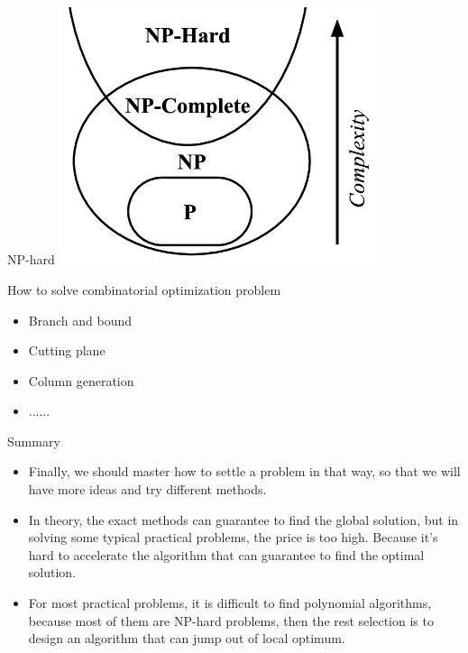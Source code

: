    \begin{frame}{NP-hard}
     \centering
     \includegraphics[width = 0.7\textwidth]{images/NP.png}
   \end{frame}

   \begin{frame}{How to solve combinatorial optimization problem}
     \Large
     \begin{spacing}{1.5}
       \begin{itemize}
         \item Branch and bound
         \item Cutting plane
         \item Column generation
         \item ......
       \end{itemize}
     \end{spacing}
   \end{frame}


   \begin{frame}{Summary}

     \begin{itemize}
       \item \textcolor{yellow}{}

       Finally, we should master how to settle a problem in that way, so that we will have more ideas and try different methods.

       \item \textcolor{yellow}{}

       In theory, the exact methods can guarantee to find the global solution, but in solving some typical practical problems, the price is too high. Because it's hard to accelerate the algorithm that can guarantee to find the optimal solution.

       \item \textcolor{yellow}{}

       For most practical problems, it is difficult to find polynomial algorithms, because most of them are NP-hard problems, then the rest selection is to design an algorithm that can jump out of local optimum.

     \end{itemize}
   \end{frame}
